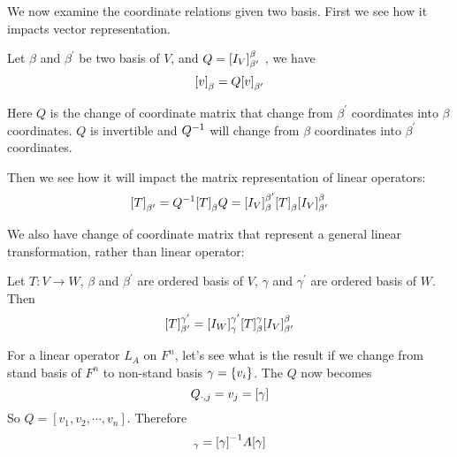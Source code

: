 We now examine the coordinate relations given two basis. First we see how it impacts vector representation. 
\begin{theorem}
    Let $\beta$ and $\beta^{\prime}$ be two basis of $V$, and $Q=\coordinate{I_V}_{\beta^\prime}^\beta$ , we have 
\begin{equation}
    \coordinate{v}_\beta = Q \coordinate{v}_{\beta^\prime}
\end{equation}    

Here $Q$ is the change of coordinate matrix that change from $\beta^\prime$ coordinates into $\beta$ coordinates. $Q$ is invertible and ${Q}^{-1}$ will change from $\beta$ coordinates into $\beta^\prime$ coordinates. 

Then we see how it will impact the matrix representation of linear operators:
\begin{equation}\label{change_of_coordinate_formula}
    \coordinate{T}_{\beta^\prime} = \inverse{Q} \coordinate{T}_{\beta} Q = \coordinate{I_V}_\beta^{\beta^\prime} \coordinate{T}_\beta \coordinate{I_V}_{\beta^\prime}^\beta
\end{equation}
\end{theorem}


We also have change of coordinate matrix that represent a general linear transformation, rather than linear operator:

\begin{theorem} \label{specialchangeofcoordinates}
	Let $T:V\rightarrow W$, $\beta$ and $\beta^\prime$ are ordered basis of $V$, $\gamma$ and $\gamma^\prime$ are ordered basis of $W$. Then
	\begin{equation}
		\coordinate{T}_{\beta^\prime}^{\gamma^\prime} = \coordinate{I_W}_\gamma^{\gamma^\prime} \coordinate{T}_\beta^\gamma \coordinate{I_V}_{\beta^\prime}^\beta
	\end{equation}
\end{theorem}


\begin{example}\label{change_coordinate_under_standard_basis}
    For a linear operator $L_A$ on $F^n$, let's see what is the result if we change from stand basis of $F^n$ to non-stand basis $\gamma = \set{v_i}$. The $Q$ now becomes
    \begin{equation*}
        {Q}_{\cdot, {j}} = v_j = [\gamma]
    \end{equation*}
    So $Q = [v_1, v_2, \cdots, v_n]$. Therefore
    \begin{equation}
        [L_A]_\gamma = \inverse{[\gamma]} A [\gamma]
    \end{equation}
\end{example}




